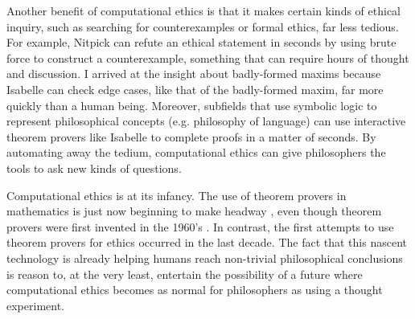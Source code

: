 \begin{isabellebody}
\begin{isamarkuptext}
Another benefit of computational ethics is that it makes certain kinds of ethical inquiry, such as 
searching for counterexamples or formal ethics, far less tedious. For example, Nitpick can refute 
an ethical statement in seconds by using brute force to construct a counterexample, something that can require hours
of thought and discussion. I arrived at the insight about badly-formed maxims because Isabelle 
can check edge cases, like that of the badly-formed maxim, far more quickly than a human being. Moreover, 
subfields that use symbolic logic to represent philosophical concepts (e.g. philosophy of language) can 
use interactive theorem provers like Isabelle to complete proofs in a matter of seconds. By automating 
away the tedium, computational ethics can give philosophers the tools to ask new kinds of questions.%
\end{isamarkuptext}\isamarkuptrue%
%
\begin{isamarkuptext}%
Computational ethics is at its infancy. The use of theorem provers in mathematics is just now beginning 
to make headway \citep{buzzardvideo}, even though theorem provers were first invented in the 1960's \citep{historyofITP}. 
In contrast, the first attempts to use theorem provers for ethics occurred in the last decade. The 
fact that this nascent technology is already helping humans reach non-trivial philosophical conclusions 
is reason to, at the very least, entertain the possibility of a future where computational ethics 
becomes as normal for philosophers as using a thought experiment.


\end{isamarkuptext}
\end{isabellebody}
